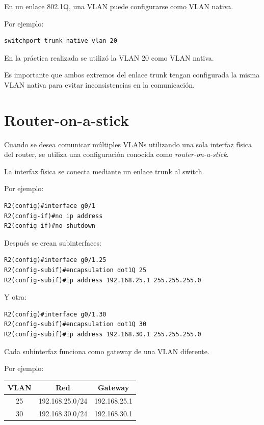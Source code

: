 \documentclass[12pt]{article}
\begin{document}
En un enlace 802.1Q, una VLAN puede configurarse como VLAN nativa.

Por ejemplo:

\begin{lstlisting}
switchport trunk native vlan 20
\end{lstlisting}

En la práctica realizada se utilizó la VLAN 20 como VLAN nativa.

Es importante que ambos extremos del enlace trunk tengan configurada la
misma VLAN nativa para evitar inconsistencias en la comunicación.


\section{Router-on-a-stick}

Cuando se desea comunicar múltiples VLANs utilizando una sola interfaz física
del router, se utiliza una configuración conocida como
\textit{router-on-a-stick}.

La interfaz física se conecta mediante un enlace trunk al switch.

Por ejemplo:

\begin{lstlisting}
R2(config)#interface g0/1
R2(config-if)#no ip address
R2(config-if)#no shutdown
\end{lstlisting}

Después se crean subinterfaces:

\begin{lstlisting}
R2(config)#interface g0/1.25
R2(config-subif)#encapsulation dot1Q 25
R2(config-subif)#ip address 192.168.25.1 255.255.255.0
\end{lstlisting}

Y otra:

\begin{lstlisting}
R2(config)#interface g0/1.30
R2(config-subif)#encapsulation dot1Q 30
R2(config-subif)#ip address 192.168.30.1 255.255.255.0
\end{lstlisting}

Cada subinterfaz funciona como gateway de una VLAN diferente.

Por ejemplo:

\begin{center}
\begin{tabular}{|c|c|c|}
\hline
\textbf{VLAN} & \textbf{Red} & \textbf{Gateway} \\
\hline
25 & 192.168.25.0/24 & 192.168.25.1 \\
30 & 192.168.30.0/24 & 192.168.30.1 \\
\hline
\end{tabular}
\end{center}
\end{document}
